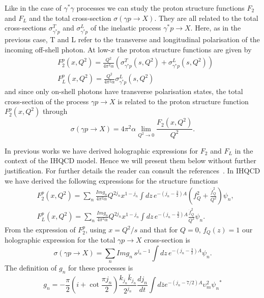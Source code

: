 \documentclass[preprint, 12pt]{elsarticle}
\begin{document}
Like in the case of $\gamma^{*} \gamma$ processes we can study the proton structure functions $F_2$ and $F_L$ and the total cross-section $\sigma\left(\gamma p \rightarrow X\right)$. They are all related to the total cross-sections $\sigma^T_{\gamma^* p}$ and $\sigma^L_{\gamma^{*} p}$ of the inelastic process $\gamma^{*} p \rightarrow X$. Here, as in the previous case, T and L refer to the transverse and longitudinal polarisation of the incoming off-shell photon. At low-$x$ the proton structure functions are given by
\begin{align}
&F_2^p\left(x, Q^2\right) = \frac{Q^2}{4 \pi^2 \alpha} \left( \sigma^T_{\gamma^* p}\left(s, Q^2\right) +  \sigma^L_{\gamma^* p}\left(s, Q^2\right)   \right) \\
&F_L^p\left(x, Q^2\right) = \frac{Q^2}{4 \pi^2 \alpha}  \sigma^L_{\gamma^* p}\left(s, Q^2\right)
\end{align}
and since only on-shell photons have transverse polarisation states, the total cross-section of the process $\gamma p \rightarrow X$ is related to the proton structure function $F_2^p\left(x, Q^2\right)$ through
\begin{equation}
\sigma\left(\gamma p \rightarrow X\right) = 4 \pi^2 \alpha \lim_{Q^2 \rightarrow 0} \frac{F_2\left(x, Q^2\right)}{Q^2}.
\end{equation}

In previous works we have derived holographic expressions for $F_2$ and $F_L$ in the context of the IHQCD model. Hence we will present them below without further justification. For further details the reader can consult the references~\cite{ballon_bayona_unity_2017, Amorim:2018yod, gluonPDF_IHQCD_2020}. 
In IHQCD we have derived the following expressions for the structure functions
\begin{align}
&F_2^p(x, Q^2) = \sum_{n} \frac{ Im g_n}{4 \pi^2 \alpha} Q^{2 j_n} x^{1-j_n} \int dz \,e^{-\left(j_n-\frac{3}{2}\right)A}  \left( f_Q^2  +  \frac{\dot{f}_Q^{2}}{Q^2}      \right) \psi_n , \\
&F_L^p(x, Q^2) = \sum_{n} \frac{Im g_n}{4 \pi^2 \alpha} Q^{2 j_n} x^{1-j_n} \int dz \,e^{-\left(j_n-\frac{3}{2}\right)A}  \frac{\dot{f}_Q^{2}}{Q^2}  \psi_n.
\end{align}
From the expression of $F_2^p$, using $x = Q^2 / s$ and that for $Q = 0, \, f_Q\left(z\right) = 1$ our holographic expression for the total  $\gamma p \rightarrow X$ cross-section is
\begin{equation}
\sigma\left(\gamma p \rightarrow X\right) =  \sum_{n} Im g_n \, s^{j_n -1 } \int dz \,e^{-\left(j_n-\frac{3}{2}\right)A}  \psi_n.
\end{equation}
The definition of $g_n$ for these processes is
\begin{equation}
g_n = - \frac{\pi}{2} \left( i + \cot \frac{\pi j_n}{2} \right) \frac{k_{j_n} \bar{k}_{j_n}}{2^{j_n}} \frac{d j_n}{dt} \int d\bar{z} e^{-\left(j_n - 7/2 \right)A} \upsilon_m^2 {\psi_n}^*
\label{eq:gn_def_gammap}
\end{equation}
\end{document}
